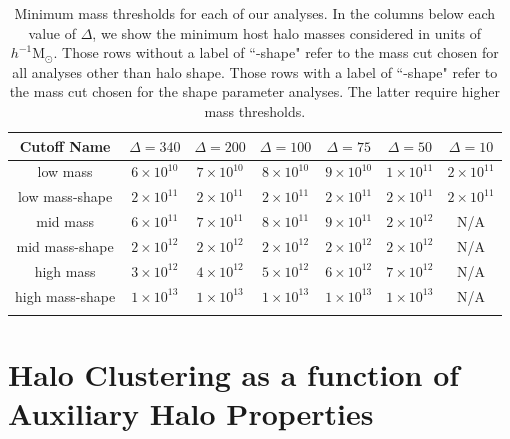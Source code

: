 \documentclass[usenatbib,fleqn]{mnras}
\begin{document}
\begin{table}
\caption{
Minimum mass thresholds for each of our analyses. 
In the columns below each value of $\Delta$, we show the minimum 
host halo masses considered in units of $h^{-1}\mathrm{M}_{\odot}$.
Those rows without a label of ``-shape" refer to the mass cut chosen for 
all analyses other than halo shape. Those rows with a label of ``-shape" refer to 
the mass cut chosen for the shape parameter analyses. The latter require higher mass thresholds.}
\vspace*{8pt}
\begin{tabular}{ c c c c c c c }
\hline
\hline
Cutoff Name &  $\Delta=340$ & $\Delta=200$ & $\Delta=100$ & $\Delta=75$ & $\Delta=50$ & $\Delta=10$ \\
\hline
\vspace*{2pt}
{low mass} & $6 \times 10^{10}$ & $7 \times 10^{10}$ & $8 \times 10^{10}$ & $9 \times 10^{10}$ & $1 \times 10^{11}$ & $2 \times 10^{11}$  \\ \vspace*{4pt}
{low mass-shape} & $2 \times 10^{11}$ & $2 \times 10^{11}$ & $2 \times 10^{11}$ & $2 \times 10^{11}$ & $2 \times 10^{11}$ & $2 \times 10^{11}$ \\
{mid mass} & $6 \times 10^{11}$ & $7 \times 10^{11}$ & $8 \times 10^{11}$ & $9 \times 10^{11}$ & $2 \times 10^{12}$ & {N/A} \\ \vspace*{4pt}
{mid mass-shape} & $2 \times 10^{12}$ & $2 \times 10^{12}$ & $2 \times 10^{12}$ & $2 \times 10^{12}$ & $2 \times 10^{12}$ & {N/A} \\
{high mass} & $3 \times 10^{12}$ & $4 \times 10^{12}$ & $5 \times 10^{12}$ & $6 \times 10^{12}$ & $7 \times 10^{12}$ & {N/A} \\ \vspace*{2pt}
{high mass-shape} & $1 \times 10^{13}$ & $1 \times 10^{13}$ & $1 \times 10^{13}$ & $1 \times 10^{13}$ & $1 \times 10^{13}$ & {N/A} \\
\hline
\hline \\
\end{tabular}
\label{table:thresholds}
\end{table}



\section[]{Halo Clustering as a function of Auxiliary Halo Properties}
\label{section:methodology}
\end{document}
